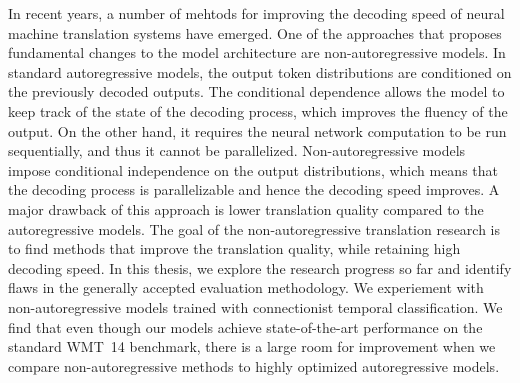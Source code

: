 In recent years, a number of mehtods for improving the decoding speed of neural
machine translation systems have emerged.
%
One of the approaches that proposes fundamental changes to the model
architecture are non-autoregressive models.
%
In standard autoregressive models, the output token distributions are
conditioned on the previously decoded outputs.
%
The conditional dependence allows the model to keep track of the state of the
decoding process, which improves the fluency of the output.
%
On the other hand, it requires the neural network computation to be run
sequentially, and thus it cannot be parallelized.
%
Non-autoregressive models impose conditional independence on the output
distributions, which means that the decoding process is parallelizable and
hence the decoding speed improves.
%
A major drawback of this approach is lower translation quality compared to the
autoregressive models.
%
The goal of the non-autoregressive translation research is to find methods that
improve the translation quality, while retaining high decoding speed.
%
In this thesis, we explore the research progress so far and identify flaws in
the generally accepted evaluation methodology.
%
We experiement with non-autoregressive models trained with connectionist
temporal classification.
%
We find that even though our models achieve state-of-the-art performance on the
standard WMT~14 benchmark, there is a large room for improvement when we
compare non-autoregressive methods to highly optimized autoregressive models.



